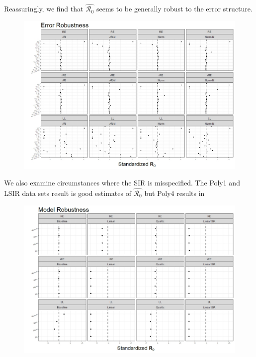 \documentclass[12pt]{article}
\newcommand{\rr}{\ensuremath{\mathcal{R}_0}}
\begin{document}
Reassuringly, we find that $\hat{\rr}$ seems to be generally robust to the error structure.  

\begin{figure}[H]
	\centering
	\includegraphics[scale=0.5]{images/err_robust.jpeg}
	\caption{}\label{fig:err-rob}
\end{figure}

We also examine circumstances where the SIR is misspecified.  The Poly1 and LSIR data sets result is good estimates of $\hat{\rr}$ but Poly4 results in   

\begin{figure}[H]
	\centering
	\includegraphics[scale=0.5]{images/model_robust.jpeg}
	\caption{}\label{fig:mod-rob}
\end{figure}
\end{document}
